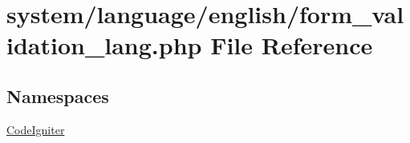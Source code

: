 \hypertarget{form__validation__lang_8php}{}\section{system/language/english/form\+\_\+validation\+\_\+lang.php File Reference}
\label{form__validation__lang_8php}
\subsection*{Namespaces}
\begin{DoxyCompactItemize}
\item 
 \mbox{\hyperlink{namespace_code_igniter}{Code\+Igniter}}
\end{DoxyCompactItemize}
